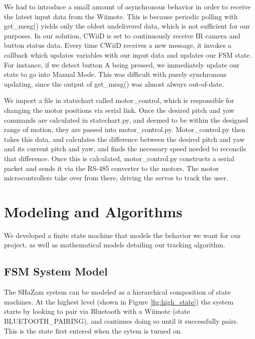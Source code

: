 \documentclass[conference, twocolumn]{IEEEtran}
\begin{document}
We had to introduce a small amount of asynchronous behavior in order to receive the latest input data from the Wiimote. This is because periodic polling with get\_mesg() yields only the oldest undelivered data, which is not sufficient for our purposes. In our solution, CWiiD is set to continuously receive IR camera and button status data. Every time CWiiD receives a new message, it invokes a callback which updates variables with our input data and updates our FSM state. For instance, if we detect button A being pressed, we immediately update our state to go into Manual Mode. This was difficult with purely synchronous updating, since the output of get\_mesg() was almost always out-of-date.

We import a file in statechart called motor\_control, which is responsible for changing the motor positions via serial link. Once the desired pitch and yaw commands are calculated in statechart.py, and deemed to be within the designed range of motion, they are passed into motor\_control.py. Motor\_control.py then takes this data, and calculates the difference between the desired pitch and yaw and its current pitch and yaw, and finds the necessary speed needed to reconcile that difference. Once this is calculated, motor\_control.py constructs a serial packet and sends it via the \mbox{RS-485} converter to the motors. The motor microcontrollers take over from there, driving the servos to track the user.

\section{Modeling and Algorithms}
\label{sec:algorithms}
We developed a finite state machine that models the behavior we want for our project, as well as mathematical models detailing our tracking algorithm.
 
 \subsection{FSM System Model}
 The SHaZam system can be modeled as a hierarchical composition of state machines. At the highest level (shown in Figure \ref{fig:high_state}) the system starts by looking to pair via Bluetooth with a Wiimote (state BLUETOOTH\_PAIRING), and continues doing so until it successfully pairs. This is the state first entered when the sytem is turned on.
 
\end{document}
